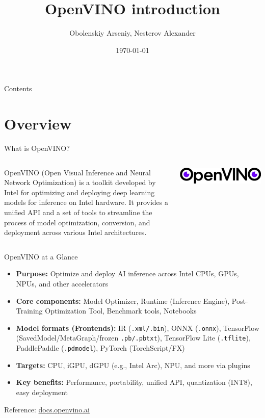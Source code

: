 \documentclass{beamer}
\title[OpenVINO introduction]{OpenVINO introduction}
\author{Obolenskiy Arseniy, Nesterov Alexander}
\institute{ITLab}
\date{\today}
\begin{document}
\begin{frame}
  \titlepage%
\end{frame}

\begin{frame}{Contents}
  \tableofcontents
\end{frame}

\section{Overview}
\begin{frame}{What is OpenVINO?}
  \begin{columns}[T,totalwidth=\textwidth]
    \begin{column}{0.7\textwidth}
      OpenVINO (Open Visual Inference and Neural Network Optimization)
      is a toolkit developed by Intel for optimizing and deploying deep learning models
      for inference on Intel hardware. It provides a unified API and a set of tools to streamline
      the process of model optimization, conversion, and deployment across various Intel architectures.
    \end{column}
    \begin{column}{0.25\textwidth}
      \centering
      \includegraphics[width=\linewidth]{openvino-logo.png}
    \end{column}
  \end{columns}
\end{frame}

\begin{frame}{OpenVINO at a Glance}
  \begin{itemize}
    \item \textbf{Purpose:} Optimize and deploy AI inference across Intel CPUs, GPUs, NPUs, and other accelerators
    \item \textbf{Core components:} Model Optimizer, Runtime (Inference Engine), Post-Training Optimization Tool, Benchmark tools, Notebooks
    \item \textbf{Model formats (Frontends):} IR (\texttt{.xml/.bin}), ONNX (\texttt{.onnx}), TensorFlow (SavedModel/MetaGraph/frozen \texttt{.pb/.pbtxt}), TensorFlow Lite (\texttt{.tflite}), PaddlePaddle (\texttt{.pdmodel}), PyTorch (TorchScript/FX)
    \item \textbf{Targets:} CPU, iGPU, dGPU (e.g., Intel Arc), NPU, and more via plugins
    \item \textbf{Key benefits:} Performance, portability, unified API, quantization (INT8), easy deployment
  \end{itemize}
  \footnotesize Reference: \href{https://docs.openvino.ai/}{docs.openvino.ai}
\end{frame}
\end{document}
